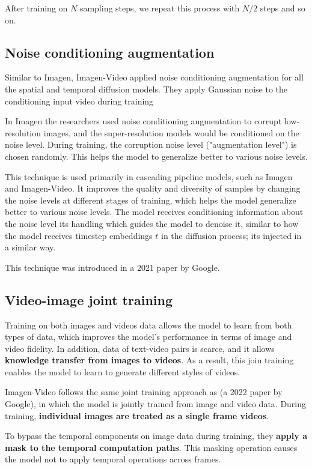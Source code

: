 After training on $N$ sampling steps, we repeat this process with $N/2$ steps and so on.












\subsection{Noise conditioning augmentation}

Similar to Imagen, Imagen-Video applied noise conditioning augmentation for all the spatial and temporal diffusion models. They apply Gaussian noise to the conditioning input video during training 

In Imagen the researchers used noise conditioning augmentation to corrupt low-resolution images, and the super-resolution models would be conditioned on the noise level. During training, the corruption noise level ("augmentation level") is chosen randomly. This helps the model to generalize better to various noise levels.

This technique is used primarily in cascading pipeline models, such as Imagen and Imagen-Video. It improves the quality and diversity of samples by changing the noise levels at different stages of training, which helps the model generalize better to various noise levels. The model receives conditioning information about the noise level its handling which guides the model to denoise it, similar to how the model receives timestep embeddings $t$ in the diffusion process; its injected in a similar way.

This technique was introduced in a 2021 paper \cite{cascaded_diffusion_models} by Google.









\subsection{Video-image joint training}

Training on both images and videos data allows the model to learn from both types of data, which improves the model's performance in terms of image and video fidelity. In addition, data of text-video pairs is scarce, and it allows \textbf{knowledge transfer from images to videos}. As a result, this join training enables the model to learn to generate different styles of videos.

Imagen-Video follows the same joint training approach as \cite{video_diffusion_models} (a 2022 paper by Google), in which the model is jointly trained from image and video data. During training, \textbf{individual images are treated as a single frame videos}.

To bypass the temporal components on image data during training, they \textbf{apply a mask to the temporal computation paths}. This masking operation causes the model not to apply temporal operations across frames.



